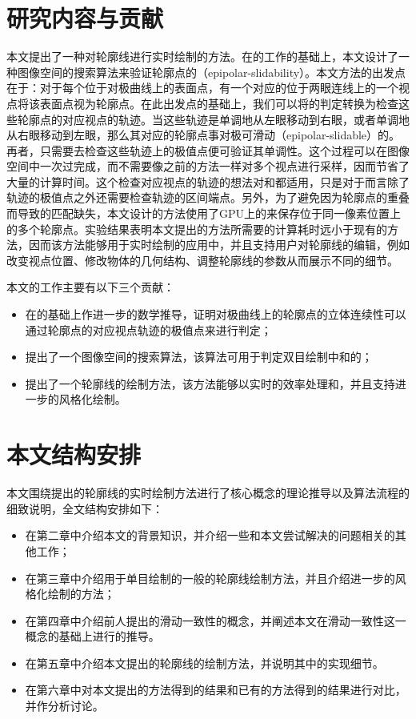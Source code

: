 \section{研究内容与贡献}

本文提出了一种对\stc{}轮廓线进行实时绘制的方法。在\citeauthor{kim2013stereoscopic}的工作的基础上，本文设计了一种图像空间的搜索算法来验证轮廓点的\epsl{}（epipolar-slidability）。本文方法的出发点在于：对于每个位于对极曲线上的表面点，有一个对应的位于两眼连线上的一个视点将该表面点视为轮廓点。在此出发点的基础上，我们可以将\epsl{}的判定转换为检查这些轮廓点的对应视点的轨迹。当这些轨迹是单调地从左眼移动到右眼，或者单调地从右眼移动到左眼，那么其对应的轮廓点事对极可滑动（epipolar-slidable）的。再者，只需要去检查这些轨迹上的极值点便可验证其单调性。这个过程可以在图像空间中一次过完成，而不需要像之前的方法一样对多个视点进行采样，因而节省了大量的计算时间。这个检查对应视点的轨迹的想法对\con{}和\scon{}都适用，只是对于\scon{}而言除了轨迹的极值点之外还需要检查轨迹的区间端点。另外，为了避免因为轮廓点的重叠而导致的匹配缺失，本文设计的方法使用了GPU上的\ppll{}\cite{yang2010real}来保存位于同一像素位置上的多个轮廓点。实验结果表明本文提出的方法所需要的计算耗时远小于现有的方法，因而该方法能够用于实时绘制的应用中，并且支持用户对\stc{}轮廓线的编辑，例如改变视点位置、修改物体的几何结构、调整轮廓线的参数从而展示不同的细节。

本文的工作主要有以下三个贡献：

\begin{itemize}
    \item 在\epsl{}的基础上作进一步的数学推导，证明对极曲线上的轮廓点的立体连续性可以通过轮廓点的对应视点轨迹的极值点来进行判定；
    \item 提出了一个图像空间的搜索算法，该算法可用于判定双目绘制中\con{}和\scon{}的\epsl{}；
    \item 提出了一个\stc{}轮廓线的绘制方法，该方法能够以实时的效率处理\con{}和\scon{}，并且支持进一步的风格化绘制。
\end{itemize}

\section{本文结构安排}

本文围绕提出的\stc{}轮廓线的实时绘制方法进行了核心概念的理论推导以及算法流程的细致说明，全文结构安排如下：

\begin{itemize}
    \item 在第二章中介绍本文的背景知识，并介绍一些和本文尝试解决的问题相关的其他工作；
    \item 在第三章中介绍用于单目绘制的一般的轮廓线绘制方法，并且介绍进一步的风格化绘制的方法；
    \item 在第四章中介绍前人提出的滑动一致性的概念，并阐述本文在滑动一致性这一概念的基础上进行的推导。
    \item 在第五章中介绍本文提出的\stc{}轮廓线的绘制方法，并说明其中的实现细节。
    \item 在第六章中对本文提出的方法得到的结果和已有的方法得到的结果进行对比，并作分析讨论。
\end{itemize}